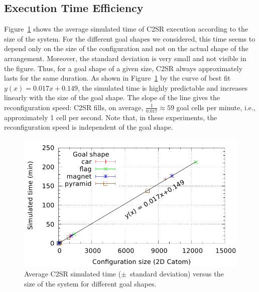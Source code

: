 \subsection{Execution Time Efficiency}





Figure~\ref{fig:reconfiguration:time} shows the average simulated time of C2SR execution according to the size of the system. For the different goal shapes we considered, this time seems to depend only on the size of the configuration and not on the actual shape of the arrangement. Moreover, the standard deviation is very small and not visible in the figure. Thus, for a goal shape of a given size, C2SR always approximately lasts for the same duration. As shown in Figure~\ref{fig:reconfiguration:time} by the curve of best fit $y(x) = 0.017 x + 0.149$, the simulated time is highly predictable and increases linearly with the size of the goal shape. The slope of the line gives the reconfiguration speed: C2SR fills, on average, $\frac{1}{0.017} \approx  59$ goal cells per minute, i.e., approximately 1 cell per second. Note that, in these experiments, the reconfiguration speed is independent of the goal shape.

\begin{figure}[!h]
	\centering
	\includegraphics[width=0.7\linewidth]{images/reconfiguration/graphs/time}
	\caption{Average C2SR simulated time ($\pm$~standard deviation) versus the size of the system for different goal shapes.}
	\label{fig:reconfiguration:time}
\end{figure}

